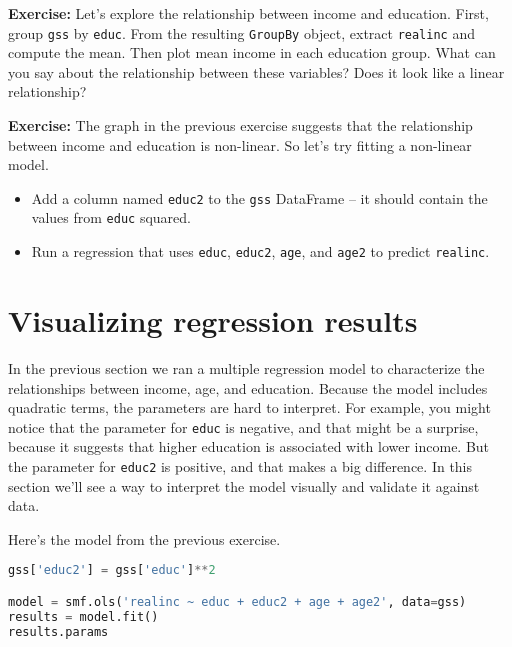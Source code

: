 \textbf{Exercise:} Let's explore the relationship between income and
education. First, group \passthrough{\lstinline!gss!} by
\passthrough{\lstinline!educ!}. From the resulting
\passthrough{\lstinline!GroupBy!} object, extract
\passthrough{\lstinline!realinc!} and compute the mean. Then plot mean
income in each education group. What can you say about the relationship
between these variables? Does it look like a linear relationship?

\textbf{Exercise:} The graph in the previous exercise suggests that the
relationship between income and education is non-linear. So let's try
fitting a non-linear model.

\begin{itemize}
\item
  Add a column named \passthrough{\lstinline!educ2!} to the
  \passthrough{\lstinline!gss!} DataFrame -- it should contain the
  values from \passthrough{\lstinline!educ!} squared.
\item
  Run a regression that uses \passthrough{\lstinline!educ!},
  \passthrough{\lstinline!educ2!}, \passthrough{\lstinline!age!}, and
  \passthrough{\lstinline!age2!} to predict
  \passthrough{\lstinline!realinc!}.
\end{itemize}

\section{Visualizing regression
results}\label{visualizing-regression-results}

In the previous section we ran a multiple regression model to
characterize the relationships between income, age, and education.
Because the model includes quadratic terms, the parameters are hard to
interpret. For example, you might notice that the parameter for
\passthrough{\lstinline!educ!} is negative, and that might be a
surprise, because it suggests that higher education is associated with
lower income. But the parameter for \passthrough{\lstinline!educ2!} is
positive, and that makes a big difference. In this section we'll see a
way to interpret the model visually and validate it against data.

Here's the model from the previous exercise.

\begin{lstlisting}[language=Python,style=source]
gss['educ2'] = gss['educ']**2

model = smf.ols('realinc ~ educ + educ2 + age + age2', data=gss)
results = model.fit()
results.params
\end{lstlisting}

